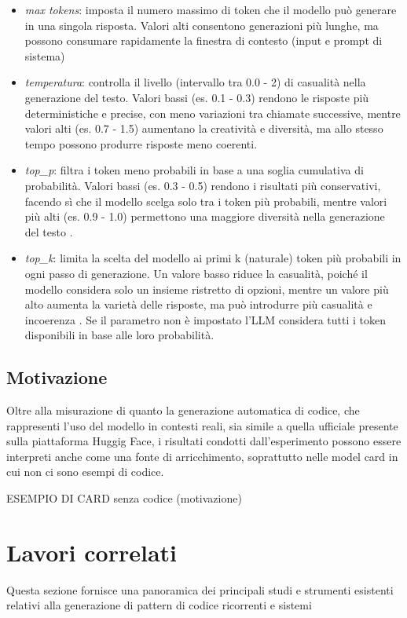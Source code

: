 \documentclass{article}
\begin{document}
\begin{itemize}
    \item \textit{max tokens}: imposta il numero massimo di token che il modello può generare in una singola risposta. Valori alti consentono generazioni più lunghe, ma possono consumare rapidamente la finestra di contesto (input e prompt di sistema)
    \item \textit{temperatura}: controlla il livello (intervallo tra 0.0 - 2) di casualità nella generazione del testo\cite{peeperkorn2024temperaturecreativityparameterlarge}. Valori bassi (es. 0.1 - 0.3) rendono le risposte più deterministiche e precise, con meno variazioni tra chiamate successive, mentre valori alti (es. 0.7 - 1.5) aumentano la creatività e diversità, ma allo stesso tempo possono produrre risposte meno coerenti.
    \item \textit{top\_p}: filtra i token meno probabili in base a una soglia cumulativa di probabilità. Valori bassi (es. 0.3 - 0.5) rendono i risultati più conservativi, facendo sì che il modello scelga solo tra i token più probabili, mentre valori più alti (es. 0.9 - 1.0) permettono una maggiore diversità nella generazione del testo \cite{Ruman2024}.
    \item \textit{top\_k}: limita la scelta del modello ai primi
    k (naturale) token più probabili in ogni passo di generazione. Un valore basso riduce la casualità, poiché il modello considera solo un insieme ristretto di opzioni, mentre un valore più alto aumenta la varietà delle risposte, ma può introdurre più casualità e incoerenza \cite{Ruman2024}. Se il parametro non è impostato l'LLM considera tutti i token disponibili in base alle loro probabilità.
\end{itemize}

\subsection{Motivazione} \label{motivation}
Oltre alla misurazione di quanto la generazione automatica di codice, che rappresenti l'uso del modello in contesti reali, sia simile a quella ufficiale presente sulla piattaforma Huggig Face, i risultati condotti dall'esperimento possono essere interpreti anche come una fonte di arricchimento, soprattutto nelle model card in cui non ci sono esempi di codice.

ESEMPIO DI CARD senza codice (motivazione)


\section{Lavori correlati}
Questa sezione fornisce una panoramica dei principali studi e strumenti esistenti relativi alla generazione di pattern di codice ricorrenti e sistemi 
\end{document}
